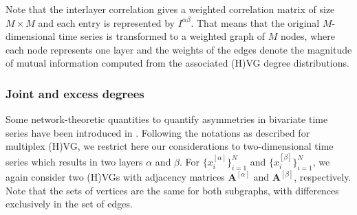 		Note that the interlayer correlation gives a weighted correlation matrix of size $M \times M$ and each entry is represented by $I^{\alpha\beta}$. That means that the original $M$-dimensional time series is transformed to a weighted graph of $M$ nodes, where each node represents one layer and the weights of the edges denote the magnitude of mutual information computed from the associated (H)VG degree distributions.  
        
        
		\subsubsection{Joint and excess degrees} \label{subsec:jointdegreeVG}
		Some network-theoretic quantities to quantify asymmetries in bivariate time series have been introduced in \cite{Zou2014}. Following the notations as described for multiplex (H)VG, we restrict here our considerations to two-dimensional time series which results in two layers $\alpha$ and $\beta$. For $\{x^{[\alpha]}_i\}_{i=1}^{N}$ and $\{x^{[\beta]}_i\}_{i=1}^{N}$, we again consider two (H)VGs with adjacency matrices $\mathbf{A}^{[\alpha]}$ and $\mathbf{A}^{[\beta]}$, respectively. Note that the sets of vertices are the same for both subgraphs, with differences exclusively in the set of edges.

